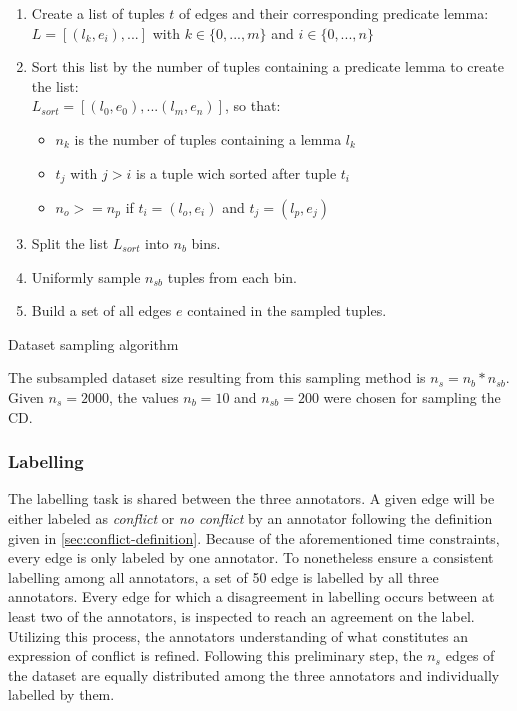 \documentclass[11pt]{scrreprt}
\begin{document}
\begin{algorithm}
\begin{enumerate}
	\item Create a list of tuples \(t\) of edges and their corresponding predicate lemma: \\ \(L = [(l_k, e_i), ...]\) with \(k \in \{0,...,m\}\) and \(i \in \{0,...,n\}\)
	\item Sort this list by the number of tuples containing a predicate lemma to create the list: \\ \(L_{sort} = [(l_0, e_0), ... (l_m, e_n)]\), so that:
	\begin{itemize}
		\item \(n_k\) is the number of tuples containing a lemma \(l_k\)
		\item \(t_j\) with \(j > i\) is a tuple wich sorted after tuple \(t_i\)
		\item \(n_o >= n_p\) if \(t_i = (l_o, e_i)\) and \(t_j = (l_p, e_j)\)
	\end{itemize}			
	\item Split the list \(L_{sort}\) into \(n_{b}\) bins.
	\item Uniformly sample \(n_{sb}\) tuples from each bin.
	\item Build a set of all edges \(e\) contained in the sampled tuples.
\end{enumerate}
\caption{Dataset sampling algorithm}
\label{algo:dataset-sampling}
\end{algorithm}

The subsampled dataset size resulting from this sampling method is \(n_{s} = n_{b} * n_{sb}\). Given \(n_{s} = 2000\), the values \(n_b = 10\) and \(n_{sb} = 200\) were chosen for sampling the CD.


\subsubsection{Labelling}
The labelling task is shared between the three annotators. A given edge will be either labeled as \textit{conflict} or \textit{no conflict} by an annotator following the definition given in \cref{sec:conflict-definition}. Because of the aforementioned time constraints, every edge is only labeled by one annotator. To nonetheless ensure a consistent labelling among all annotators, a set of 50 edge is labelled by all three annotators. Every edge for which a disagreement in labelling occurs between at least two of the annotators, is inspected to reach an agreement on the label. Utilizing this process, the annotators understanding of what constitutes an expression of conflict is refined. Following this preliminary step, the \(n_s\) edges of the dataset are equally distributed among the three annotators and individually labelled by them.
\end{document}
